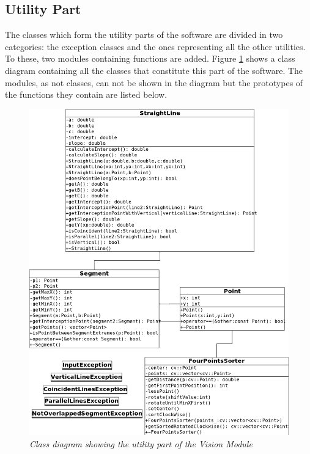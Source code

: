 		\subsection{Utility Part}
		The classes which form the utility parts of the software are divided in two categories: the exception classes and the ones representing all the other utilities. 
		To these, two modules containing functions are added. 
		Figure \ref{fig:impl_utility} shows a class diagram containing all the classes that constitute this part of the software. 
		The modules, as not classes, can not be shown in the diagram but the prototypes of the functions they contain are listed below.
		\begin{figure}[h]
		  \begin{center} 
		    	
		       \includegraphics[width=\textwidth*\real{0.81}]{images/appendix/utility.png}
		    
		  \end{center} 
		  \caption{\textit{Class diagram showing the utility part of the Vision Module}}  
		  \label{fig:impl_utility}
	 	\end{figure}
		
